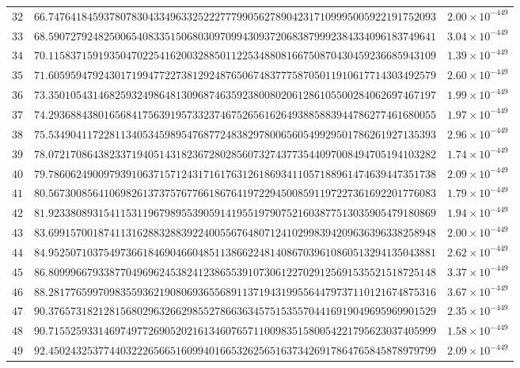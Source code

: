 \documentclass[12pt,reqno]{amsart}
\theoremstyle{plain}
\theoremstyle{definition}
\theoremstyle{remark}
\begin{document}
\begin{longtable}{clc}
$32$ & $66.7476418459378078304334963325222777990562789042317109995005922191752093$ & $2.00 \times 10^{-449}$ \\
$33$ & $68.5907279248250065408335150680309709943093720683879992384334096183749641$ & $3.04 \times 10^{-449}$ \\
$34$ & $70.1158371591935047022541620032885011225348808166750870430459236685943109$ & $1.39 \times 10^{-449}$ \\
$35$ & $71.6059594792430171994772273812924876506748377758705011910617714303492579$ & $2.60 \times 10^{-449}$ \\
$36$ & $73.3501054314682593249864813096874635923800802061286105500284062697467197$ & $1.99 \times 10^{-449}$ \\
$37$ & $74.2936884380165684175639195733237467526561626493885883944786277461680055$ & $1.97 \times 10^{-449}$ \\
$38$ & $75.5349041172281134053459895476877248382978006560549929501786261927135393$ & $2.96 \times 10^{-449}$ \\
$39$ & $78.0721708643823371940514318236728028560732743773544097008494705194103282$ & $1.74 \times 10^{-449}$ \\
$40$ & $79.7860624900979391063715712431716176312618693411057188961474639447351738$ & $2.09 \times 10^{-449}$ \\
$41$ & $80.5673008564106982613737576776618676419722945008591197227361692201776083$ & $1.79 \times 10^{-449}$ \\
$42$ & $81.9233808931541153119679895539059141955197907521603877513035905479180869$ & $1.94 \times 10^{-449}$ \\
$43$ & $83.6991570018741131628832883922400556764807124102998394209636396338258948$ & $2.00 \times 10^{-449}$ \\
$44$ & $84.9525071037549736618469046604851138662248140867039610860513294135043881$ & $2.62 \times 10^{-449}$ \\
$45$ & $86.8099966793387704969624538241238655391073061227029125691535521518725148$ & $3.37 \times 10^{-449}$ \\
$46$ & $88.2817765997098355936219080693655689113719431995564479737110121674875316$ & $3.67 \times 10^{-449}$ \\
$47$ & $90.3765731821281568029632662985527866363457515355704416919049695969901529$ & $2.35 \times 10^{-449}$ \\
$48$ & $90.7155259331469749772690520216134607657110098351580054221795623037405999$ & $1.58 \times 10^{-449}$ \\
$49$ & $92.4502432537744032226566516099401665326256516373426917864765845878979799$ & $2.09 \times 10^{-449}$ \\

\end{longtable}
\end{document}

